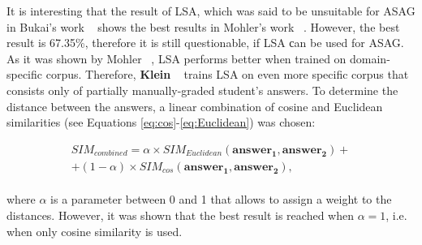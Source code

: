 It is interesting that the result of LSA, which was said to be unsuitable for ASAG in Bukai's work ~\cite{SAMText} shows the best results in Mohler's work ~\cite{Mohler}. However, the best result is 67.35\%, therefore it is still questionable, if LSA сan be used for ASAG. \\

As it was shown by Mohler ~\cite{Mohler}, LSA performs better when trained on domain-specific corpus. Therefore, \textbf{Klein} ~\cite{Klein} trains LSA on even more specific corpus that consists only of partially manually-graded student's answers. To determine the distance between the answers, a linear combination of cosine and Euclidean similarities (see Equations \ref{eq:cos}-\ref{eq:Euclidean}) was chosen:

\begin{equation} \label{eq:combinedCE}
\begin{array}{l}
SIM_{combined} = \alpha  \times SIM_{Euclidean}(\pmb{answer_1}, \pmb{answer_2}) + \\ + (1-\alpha) \times SIM_{cos}(\pmb{answer_1}, \pmb{answer_2}),
\end{array}
\end{equation}\\
 where $\alpha$ is a parameter between 0 and 1 that allows to assign a weight to the distances. However, it was shown that the best result is reached when $\alpha = 1$, i.e. when only cosine similarity is used. \\
  
